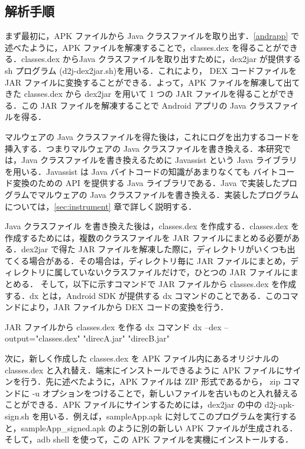 \subsection{解析手順}
\label{analysismethod}
まず最初に，APK ファイルから Java クラスファイルを取り出す．\ref{andrapp} で述べたように，APK ファイルを解凍することで，classes.dex を得ることができる．classes.dex からJava クラスファイルを取り出すために，dex2jar \cite{d2jar} が提供する sh プログラム (d2j-dex2jar.sh)を用いる．これにより， DEX コードファイルを JAR ファイルに変換することができる．よって，APK ファイルを解凍して出てきた classes.dex から dex2jar を用いて 1 つの JAR ファイルを得ることができる．この JAR ファイルを解凍することで Android アプリの Java クラスファイルを得る．

マルウェアの Java クラスファイルを得た後は，これにログを出力するコードを挿入する．つまりマルウェアの Java クラスファイルを書き換える．本研究では，Java クラスファイルを書き換えるために Javassist \cite{javassist} という Java ライブラリを用いる．Javassist は Java バイトコードの知識があまりなくても バイトコード変換のための API を提供する Java ライブラリである．Java で実装したプログラムでマルウェアの Java クラスファイルを書き換える．実装したプログラムについては，\ref{sec:instrument} 章で詳しく説明する．

Java クラスファイル を書き換えた後は，classes.dex を作成する．classes.dex を作成するためには，複数のクラスファイルを JAR ファイルにまとめる必要がある．dex2jar で得た JAR ファイルを解凍した際に，ディレクトリがいくつも出てくる場合がある．その場合は，ディレクトリ毎に JAR ファイルにまとめ，ディレクトリに属していないクラスファイルだけで，ひとつの JAR ファイルにまとめる． そして，以下に示すコマンドで JAR ファイルから classes.dex を作成する．dx とは，Android SDK が提供する dx コマンドのことである．このコマンドにより，JAR ファイルから DEX コードの変換を行う．

\begin{itembox}[l]{JAR ファイルから classes.dex を作る dx コマンド}
	dx --dex --output="classes.dex" "direcA.jar" "direcB.jar" 
\end{itembox}

次に，新しく作成した classes.dex を APK ファイル内にあるオリジナルの classes.dex と入れ替え．端末にインストールできるように APK ファイルにサインを行う．先に述べたように，APK ファイルは ZIP 形式であるから， zip コマンドに -u オプションをつけることで，新しいファイルを古いものと入れ替えることができる．APK ファイルにサインするためには，dex2jar の中の d2j-apk-sign.sh を用いる．例えば，sampleApp.apk に対してこのプログラムを実行すると，sampleApp\_signed.apk のように別の新しい APK ファイルが生成される．そして，adb shell を使って，この APK ファイルを実機にインストールする．

